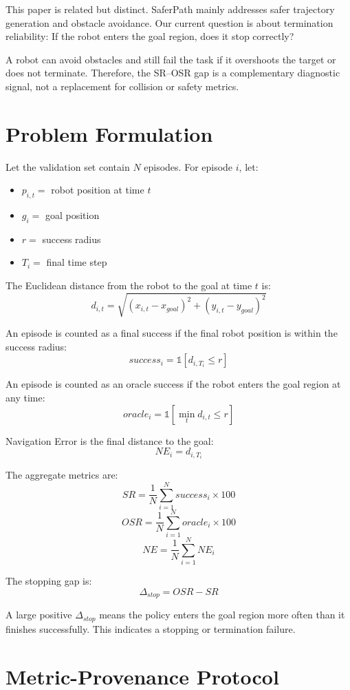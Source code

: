 \documentclass[conference]{IEEEtran}
\begin{document}
This paper is related but distinct. SaferPath mainly addresses safer trajectory generation and obstacle avoidance. Our current question is about termination reliability: If the robot enters the goal region, does it stop correctly?

A robot can avoid obstacles and still fail the task if it overshoots the target or does not terminate. Therefore, the SR--OSR gap is a complementary diagnostic signal, not a replacement for collision or safety metrics.

\section{Problem Formulation}

Let the validation set contain $N$ episodes. For episode $i$, let:
\begin{itemize}
    \item $p_{i,t} = $ robot position at time $t$
    \item $g_i = $ goal position
    \item $r = $ success radius
    \item $T_i = $ final time step
\end{itemize}

The Euclidean distance from the robot to the goal at time $t$ is:
\[
d_{i,t} = \sqrt{(x_{i,t} - x_{goal})^2 + (y_{i,t} - y_{goal})^2}
\]

An episode is counted as a final success if the final robot position is within the success radius:
\[
success_i = \mathbb{1}[d_{i,T_i} \le r]
\]

An episode is counted as an oracle success if the robot enters the goal region at any time:
\[
oracle_i = \mathbb{1}[\min_t d_{i,t} \le r]
\]

Navigation Error is the final distance to the goal:
\[
NE_i = d_{i,T_i}
\]

The aggregate metrics are:
\[
SR = \frac{1}{N} \sum_{i=1}^N success_i \times 100
\]
\[
OSR = \frac{1}{N} \sum_{i=1}^N oracle_i \times 100
\]
\[
NE = \frac{1}{N} \sum_{i=1}^N NE_i
\]

The stopping gap is:
\[
\Delta_{stop} = OSR - SR
\]

A large positive $\Delta_{stop}$ means the policy enters the goal region more often than it finishes successfully. This indicates a stopping or termination failure.

\section{Metric-Provenance Protocol}
\end{document}

